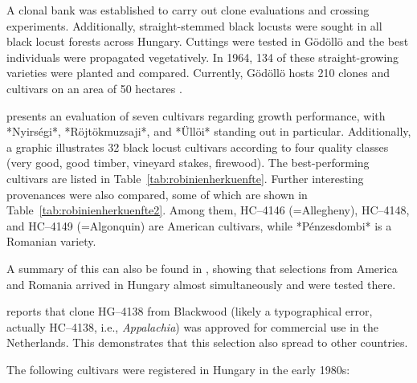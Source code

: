 A clonal bank was established to carry out clone evaluations and crossing experiments. Additionally, straight-stemmed black locusts were sought in all black locust forests across Hungary. Cuttings were tested in Gödöllö and the best individuals were propagated vegetatively. In 1964, 134 of these straight-growing varieties were planted and compared. Currently, Gödöllö hosts 210 clones and cultivars on an area of 50 hectares \citep{redei2005robinieVermehrung,csiha2016robinie}.

\citet{keresztesi1974robinie} presents an evaluation of seven cultivars regarding growth performance, with *Nyirségi*, *Röjtökmuzsaji*, and *Üllöi* standing out in particular. Additionally, a graphic illustrates 32 black locust cultivars according to four quality classes (very good, good timber, vineyard stakes, firewood). The best-performing cultivars are listed in Table~\ref{tab:robinienherkuenfte}. Further interesting provenances were also compared, some of which are shown in Table~\ref{tab:robinienherkuenfte2}. Among them, HC--4146 (=Allegheny), HC--4148, and HC--4149 (=Algonquin) are American cultivars, while *Pénzesdombi* is a Romanian variety.


A summary of this can also be found in \citet{keresztesi1983robinie}, showing that selections from America and Romania arrived in Hungary almost simultaneously and were tested there.

\citet{bluemke1955robinie} reports that clone HG--4138 from Blackwood (likely a typographical error, actually HC--4138, i.e., \emph{Appalachia}) was approved for commercial use in the Netherlands. This demonstrates that this selection also spread to other countries.

The following cultivars were registered in Hungary in the early 1980s:

